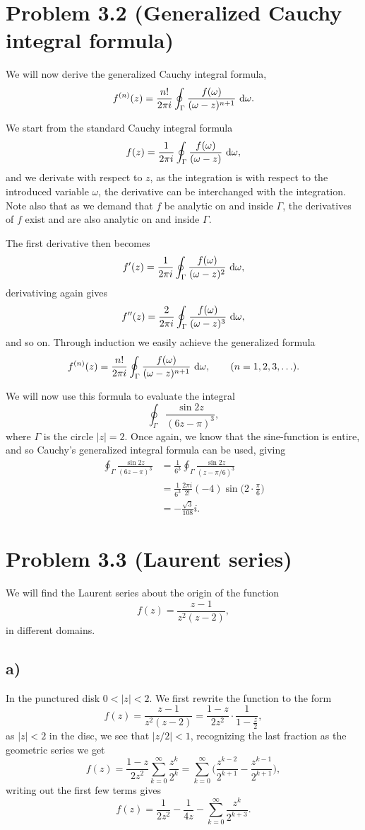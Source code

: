 \documentclass[a4paper, 11pt, titlepage, english]{article}
\renewcommand{\d}{{\rm d}}
\begin{document}
\clearpage

\section*{Problem 3.2 (Generalized Cauchy integral formula)}
We will now derive the generalized Cauchy integral formula,
$$f^{(n)}(z) = \frac{n!}{2\pi i} \oint_\Gamma \frac{f(\omega)}{(\omega-z)^{n+1}} \ \d \omega.$$

We start from the standard Cauchy integral formula
$$f(z) = \frac{1}{2\pi i} \oint_\Gamma \frac{f(\omega)}{(\omega-z)} \ \d \omega,$$
and we derivate with respect to $z$, as the integration is with respect to the introduced variable $\omega$, the derivative can be interchanged with the integration. Note also that as we demand that $f$ be analytic on and inside $\Gamma$, the derivatives of $f$ exist and are also analytic on and inside $\Gamma$. 

The first derivative then becomes
$$f'(z) = \frac{1}{2\pi i} \oint_\Gamma \frac{f(\omega)}{(\omega-z)^2} \ \d \omega,$$
derivativing again gives
$$f''(z) = \frac{2}{2\pi i} \oint_\Gamma \frac{f(\omega)}{(\omega-z)^3} \ \d \omega,$$
and so on. Through induction we easily achieve the generalized formula
$$f^{(n)}(z) = \frac{n!}{2\pi i} \oint_\Gamma \frac{f(\omega)}{(\omega-z)^{n+1}} \ \d \omega, \qquad (n=1,2,3,\ldots).$$

We will now use this formula to evaluate the integral
$$\oint_\Gamma \frac{\sin 2z}{(6z-\pi)^3},$$
where $\Gamma$ is the circle $|z| = 2$. Once again, we know that the sine-function is entire, and so Cauchy's generalized integral formula can be used, giving
\begin{align*}
\oint_\Gamma \frac{\sin 2z}{(6z-\pi)^3} &= \frac{1}{6^3}\oint_\Gamma \frac{\sin 2z}{(z-\pi/6)^3} \\[0.2cm]
&= \frac{1}{6^3}\frac{2\pi i}{2!}(-4)\sin\bigg(2\cdot\frac{\pi}{6}\bigg) \\
&= -\frac{\sqrt{3}}{108}i.
\end{align*}

\clearpage

\section*{Problem 3.3 (Laurent series)}
We will find the Laurent series about the origin of the function
$$f(z) = \frac{z-1}{z^2(z-2)},$$
in different domains.

\subsection*{a)}
In the punctured disk $0 < |z| < 2$. We first rewrite the function to the form
$$f(z) = \frac{z-1}{z^2(z-2)} = \frac{1-z}{2z^2}\cdot\frac{1}{1-\frac{z}{2}},$$
as $|z|<2$ in the disc, we see that $|z/2|<1$, recognizing the last fraction as the geometric series we get 
$$f(z)  = \frac{1-z}{2z^2}\sum_{k=0}^\infty \frac{z^k}{2^k} = \sum_{k=0}^\infty \bigg(\frac{z^{k-2}}{2^{k+1}} - \frac{z^{k-1}}{2^{k+1}}\bigg),$$
writing out the first few terms gives
$$f(z) = \frac{1}{2z^2} - \frac{1}{4z} - \sum_{k=0}^\infty \frac{z^k}{2^{k+3}}.$$
\end{document}
